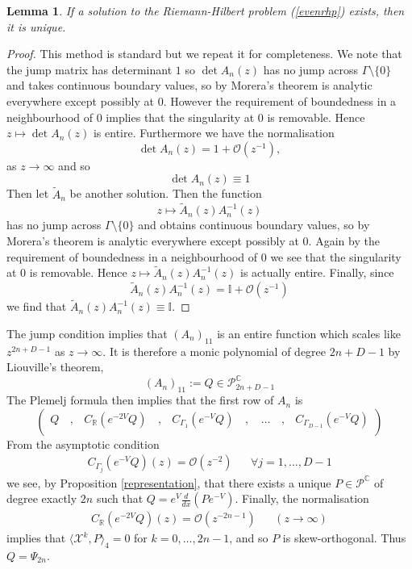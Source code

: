 \documentclass[12pt]{article}
\newtheorem{lemma}[theorem]{Lemma}
\theoremstyle{definition}
\begin{document}
\begin{lemma}\label{uniqueness} If a solution to the Riemann-Hilbert problem (\ref{evenrhp}) exists, then it is unique.
\end{lemma}
\begin{proof}
This method is standard but we repeat it for completeness. We note that the jump matrix has determinant $1$ so $\det A_{n}(z) $ has no jump across $\Gamma \setminus \{ 0 \}$ and takes continuous boundary values, so by Morera's theorem is analytic everywhere except possibly at $0$.  However the requirement of boundedness in a neighbourhood of $0$ implies that the singularity at $0$ is removable.  Hence $z \mapsto \det A_{n}(z)$ is entire.  Furthermore we have the normalisation $$\det A_{n}(z)  = 1 + \mathcal{O}(z^{-1}),$$ as $z \to \infty$ and so $$\det A_{n}(z)  \equiv 1$$
Then let $\tilde{A}_{n}$ be another solution. Then the function $$z \mapsto \tilde{A}_{n}(z) A_{n}^{-1}(z)$$ has no jump across $\Gamma \setminus \{0 \}$ and obtains continuous boundary values, so by Morera's theorem is analytic everywhere except possibly at $0$.  Again by the requirement of boundedness in a neighbourhood of $0$ we see that the singularity at $0$ is removable.  Hence $z \mapsto \tilde{A}_{n}(z) A_{n}^{-1}(z)$ is actually entire.  Finally, since $$\tilde{A}_{n}(z) A_{n}^{-1}(z) = \mathbb{I}+\mathcal{O}(z^{-1})$$ we find that $\tilde{A}_{n}(z) A_{n}^{-1}(z) \equiv \mathbb{I}$.
\end{proof}
The jump condition implies that $(A_{n})_{11}$ is an entire function which scales like $z^{2n+D-1}$ as $z \to \infty$. It is therefore a monic polynomial of degree $2n+D-1$ by Liouville's theorem, $$(A_{n})_{11} := Q \in \mathscr{P}_{2n+D-1}^\mathbb{C}$$
The Plemelj formula then implies that the first row of $A_{n}$ is
$$\left(\begin{array}{ccccccccccccc} Q & \,  , \,&  C_{\mathbb{R}}(e^{-2V}  Q) & \, , \,& C_{\Gamma_1}(e^{-V}  Q) & \, , \,& \, \dots & \,  , \,& C_{\Gamma_{D-1}}(e^{-V}  Q) \\
\end{array}\right)
 $$
 From the asymptotic condition 
 \begin{align*}
 C_{\Gamma_j}(e^{-V}  Q)(z) = \mathcal{O}(z^{-2}) & & \forall j=1, \dots, D-1
 \end{align*}
we see, by Proposition \ref{representation}, that there exists a unique $P \in \mathscr{P}^\mathbb{C}$ of degree exactly $2n$ such that $Q = e^{V} \frac{d}{dx}(P e^{-V})$.  Finally, the normalisation
\begin{align*}
C_{\mathbb{R}}(e^{-2V}  Q)(z) = \mathcal{O}(z^{-2n-1}) & & (z \to \infty)
\end{align*}
implies that $\langle \mathscr{X}^k , P\rangle_4 =0 $ for $k=0, \dots, 2n-1$,  and so $P$ is skew-orthogonal. Thus $Q = \Psi_{2n}$.
\end{document}

